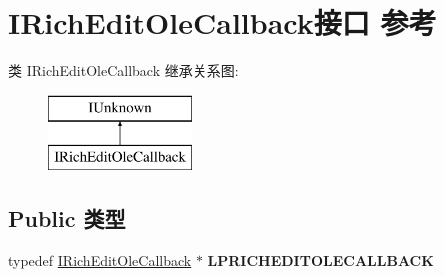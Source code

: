 \hypertarget{interface_i_rich_edit_ole_callback}{}\section{I\+Rich\+Edit\+Ole\+Callback接口 参考}
\label{interface_i_rich_edit_ole_callback}
类 I\+Rich\+Edit\+Ole\+Callback 继承关系图\+:\begin{figure}[H]
\begin{center}
\leavevmode
\includegraphics[height=2.000000cm]{interface_i_rich_edit_ole_callback}
\end{center}
\end{figure}
\subsection*{Public 类型}
\begin{DoxyCompactItemize}
\item 
\mbox{\label{interface_i_rich_edit_ole_callback_a6942dcee0fac17639f68db7cf4cfd1d6}} 
typedef \hyperlink{interface_i_rich_edit_ole_callback}{I\+Rich\+Edit\+Ole\+Callback} $\ast$ {\bfseries L\+P\+R\+I\+C\+H\+E\+D\+I\+T\+O\+L\+E\+C\+A\+L\+L\+B\+A\+CK}
\end{DoxyCompactItemize}
